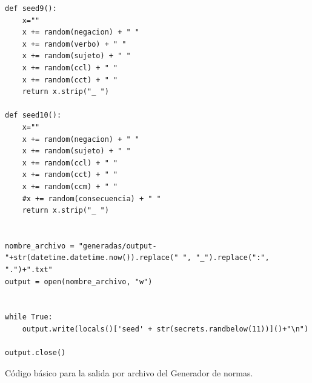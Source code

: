 \documentclass[12pt,twocolumn]{article}
\begin{document}
\begin{lstlisting}[texcl=true]
def seed9():
    x=""
    x += random(negacion) + " "
    x += random(verbo) + " "
    x += random(sujeto) + " "
    x += random(ccl) + " "
    x += random(cct) + " "
    return x.strip("_ ")

def seed10():
    x=""
    x += random(negacion) + " "
    x += random(sujeto) + " "
    x += random(ccl) + " "
    x += random(cct) + " "
    x += random(ccm) + " "
    #x += random(consecuencia) + " "
    return x.strip("_ ")


nombre_archivo = "generadas/output-"+str(datetime.datetime.now()).replace(" ", "_").replace(":", ".")+".txt"
output = open(nombre_archivo, "w")


while True:
    output.write(locals()['seed' + str(secrets.randbelow(11))]()+"\n")

output.close()
\end{lstlisting}
Código básico para la salida por archivo del Generador de normas.\newpage
\end{document}

